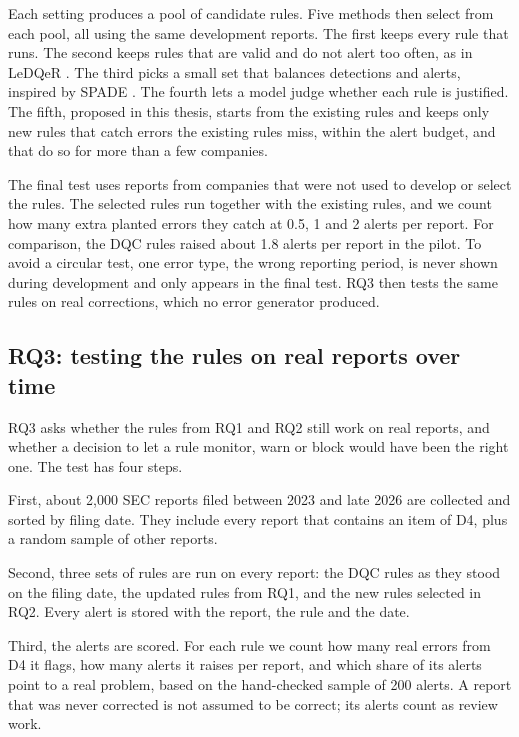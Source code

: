\documentclass[11pt,a4paper]{article}
\let\oldsubsection\subsection
\renewcommand{\subsection}{\FloatBarrier\oldsubsection}
\begin{document}
Each setting produces a pool of candidate rules. Five methods then select from each pool, all using the same development reports. The first keeps every rule that runs. The second keeps rules that are valid and do not alert too often, as in LeDQeR \cite{ledqer}. The third picks a small set that balances detections and alerts, inspired by SPADE \cite{spade}. The fourth lets a model judge whether each rule is justified. The fifth, proposed in this thesis, starts from the existing rules and keeps only new rules that catch errors the existing rules miss, within the alert budget, and that do so for more than a few companies.

The final test uses reports from companies that were not used to develop or select the rules. The selected rules run together with the existing rules, and we count how many extra planted errors they catch at 0.5, 1 and 2 alerts per report. For comparison, the DQC rules raised about 1.8 alerts per report in the pilot. To avoid a circular test, one error type, the wrong reporting period, is never shown during development and only appears in the final test. RQ3 then tests the same rules on real corrections, which no error generator produced.

\subsection{RQ3: testing the rules on real reports over time}
\label{sec:rq3}

RQ3 asks whether the rules from RQ1 and RQ2 still work on real reports, and whether a decision to let a rule monitor, warn or block would have been the right one. The test has four steps.

First, about 2,000 SEC reports filed between 2023 and late 2026 are collected and sorted by filing date. They include every report that contains an item of D4, plus a random sample of other reports.

Second, three sets of rules are run on every report: the DQC rules as they stood on the filing date, the updated rules from RQ1, and the new rules selected in RQ2. Every alert is stored with the report, the rule and the date.

Third, the alerts are scored. For each rule we count how many real errors from D4 it flags, how many alerts it raises per report, and which share of its alerts point to a real problem, based on the hand-checked sample of 200 alerts. A report that was never corrected is not assumed to be correct; its alerts count as review work.
\end{document}
